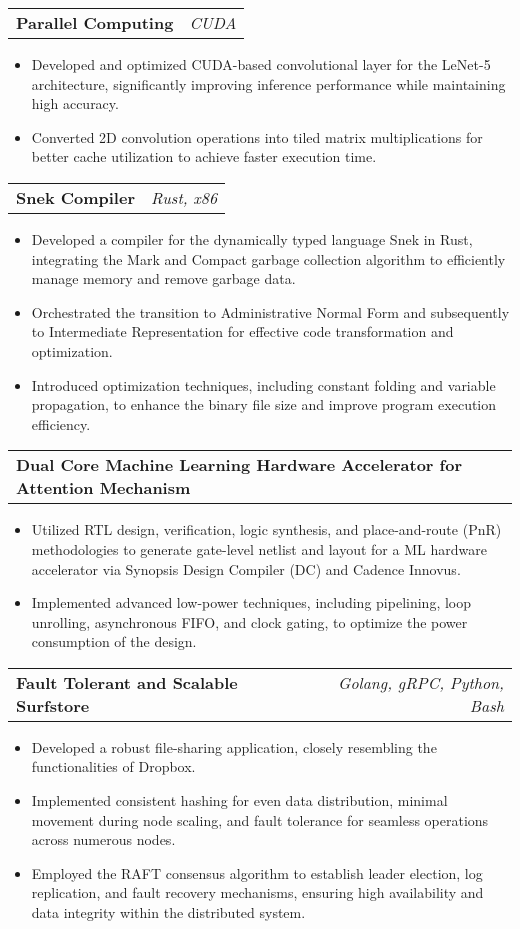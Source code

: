 \documentclass[letterpaper,11pt]{article}
\makeatletter
\newcommand{\resumeItem}[1]{
  \item\small{
    {#1 \vspace{-2pt}}
  }
}
\newcommand{\resumeProjectHeading}[2]{
    \vspace{-2pt}\item
    \begin{tabular*}{0.97\textwidth}{l@{\extracolsep{\fill}}r}
      \textcolor{secondary_color}{\textbf{#1}} & \textcolor{secondary_color}{\textit{\small #2}} \\
    \end{tabular*}\vspace{-7pt}
}
\newcommand{\resumeItemListStart}{\begin{itemize}}
\newcommand{\resumeItemListEnd}{\end{itemize}\vspace{-5pt}}
\makeatother
\begin{document}
      \resumeProjectHeading
        {\textbf{Parallel Computing}}{CUDA}
          \resumeItemListStart
            \resumeItem{Developed and optimized CUDA-based convolutional layer for the LeNet-5 architecture, significantly improving inference performance while maintaining high accuracy.}
            \resumeItem{Converted 2D convolution operations into tiled matrix multiplications for better cache utilization to achieve faster execution time.}
          \resumeItemListEnd

      \resumeProjectHeading
        {\textbf{Snek Compiler}}{Rust, x86}
          \resumeItemListStart
            \resumeItem{Developed a compiler for the dynamically typed language Snek in Rust, integrating the Mark and Compact garbage collection algorithm to efficiently manage memory and remove garbage data.}
            \resumeItem{Orchestrated the transition to Administrative Normal Form and subsequently to Intermediate Representation for effective code transformation and optimization.}
            \resumeItem{Introduced optimization techniques, including constant folding and variable propagation, to enhance the binary file size and improve program execution efficiency.}
          \resumeItemListEnd
      
      \resumeProjectHeading
        {\textbf{Dual Core Machine Learning Hardware Accelerator for Attention Mechanism}}{}
          \resumeItemListStart
            \resumeItem{Utilized RTL design, verification, logic synthesis, and place-and-route (PnR) methodologies to generate gate-level netlist and layout for a ML hardware accelerator via Synopsis Design Compiler (DC) and Cadence Innovus.}
            \resumeItem{Implemented advanced low-power techniques, including pipelining, loop unrolling, asynchronous FIFO, and clock gating, to optimize the power consumption of the design.}
          \resumeItemListEnd
      
      \resumeProjectHeading
        {\textbf{Fault Tolerant and Scalable Surfstore}}{Golang, gRPC, Python, Bash}
          \resumeItemListStart
            \resumeItem{Developed a robust file-sharing application, closely resembling the functionalities of Dropbox.}
            \resumeItem{Implemented consistent hashing for even data distribution, minimal movement during node scaling, and fault tolerance for seamless operations across numerous nodes.}
            \resumeItem{Employed the RAFT consensus algorithm to establish leader election, log replication, and fault recovery mechanisms, ensuring high availability and data integrity within the distributed system.}
          \resumeItemListEnd
\end{document}
